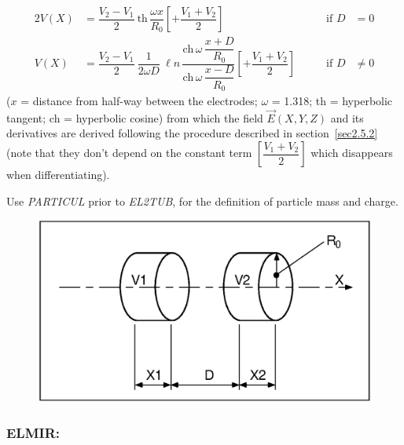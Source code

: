  \begin{alignat*}{2}
	 V(X) &   = \dfrac{ V_2-V_1}{2} \: \text{th}\,
	            \dfrac{\omega x }{ R_0} 
	             \left[+ \dfrac{V_1+V_2 }{ 2} \right] 
	      & \qquad \text{if }  D & =0\\
	V(X) &  =  \dfrac{ V_2-V_1 }{ 2}\: \dfrac{1}{ 2\omega D} \: \ell n\,
	           \dfrac{\text{ch}\, \omega\,    \dfrac{x+D }{ R_0} }%
	           {\text{ch} \,\omega \,\dfrac{x-D }{ R_0}}
	           \left[+ \dfrac{V_1+V_2 }{ 2} \right]
	            & \qquad \text{if }  D &  \not= 0 
 \end{alignat*}
%
($ x $ = distance from half-way between the electrodes;
$\omega$  =  1.318; th =  hyperbolic tangent; ch  =  hyperbolic cosine)
from which the field $ \vec  E(X,Y,Z) $ and its derivatives are derived following the 
procedure described in section~\ref{sec2.5.2}  (note that they don't 
depend on the constant term $ \left[\dfrac{V_1+V_2 }{ 2} \right] $ which
disappears when differentiating). 

\noindent Use \textsl{PARTICUL} prior to \textsl{EL2TUB}, for the
 definition of  particle mass and charge.

\vfill

\begin{figure}[H]
\centerline{\includegraphics[width=14cm]{Fig22.ps}}
\caption{\CapELtwoTUB \label{fig22}}
\end{figure}

\vfill

\newpage

\subsubsection*{ELMIR: \ELMIRTitl }\label{ELMIR}
\medskip

